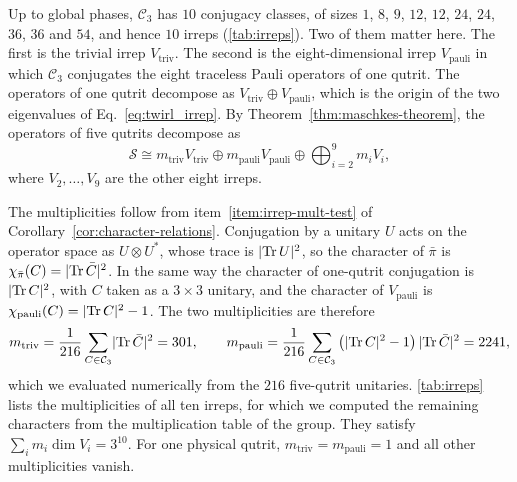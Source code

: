 Up to global phases, $\mathcal{C}_3$ has $10$ conjugacy classes, of sizes $1$, $8$, $9$, $12$, $12$, $24$, $24$, $36$, $36$ and $54$, and hence $10$ irreps (\autoref{tab:irreps}). Two of them matter here. The first is the trivial irrep $V_{\mathrm{triv}}$. The second is the eight-dimensional irrep $V_{\mathrm{pauli}}$ in which $\mathcal{C}_3$ conjugates the eight traceless Pauli operators of one qutrit. The operators of one qutrit decompose as $V_{\mathrm{triv}} \oplus V_{\mathrm{pauli}}$, which is the origin of the two eigenvalues of Eq.~\eqref{eq:twirl_irrep}. By Theorem~\ref{thm:maschkes-theorem}, the operators of five qutrits decompose as
\begin{equation}
    \mathcal{S} \cong m_{\mathrm{triv}} V_{\mathrm{triv}} \oplus m_{\mathrm{pauli}} V_{\mathrm{pauli}} \oplus \bigoplus_{i = 2}^{9} m_i V_i ,
    \label{eq:irrep-decomposition}
\end{equation}
where $V_2, \dots, V_9$ are the other eight irreps.

The multiplicities follow from item~\ref{item:irrep-mult-test} of Corollary~\ref{cor:character-relations}. Conjugation by a unitary $U$ acts on the operator space as $U \otimes U^{*}$, whose trace is $\lvert \operatorname{\mathrm{Tr}} U \rvert^2$, so the character of $\bar\pi$ is $\chi_{\bar\pi}(C) = \lvert \operatorname{\mathrm{Tr}} \bar C \rvert^2$. In the same way the character of one-qutrit conjugation is $\lvert \operatorname{\mathrm{Tr}} C \rvert^2$, with $C$ taken as a $3 \times 3$ unitary, and the character of $V_{\mathrm{pauli}}$ is $\chi_{\mathrm{pauli}}(C) = \lvert \operatorname{\mathrm{Tr}} C \rvert^2 - 1$. The two multiplicities are therefore
\begin{equation}
    m_{\mathrm{triv}} = \frac{1}{216} \sum_{C \in \mathcal{C}_3} \lvert \operatorname{\mathrm{Tr}} \bar C \rvert^2 = 301 ,
    \qquad
    m_{\mathrm{pauli}} = \frac{1}{216} \sum_{C \in \mathcal{C}_3} \left( \lvert \operatorname{\mathrm{Tr}} C \rvert^2 - 1 \right) \lvert \operatorname{\mathrm{Tr}} \bar C \rvert^2 = 2241 ,
    \label{eq:multiplicities}
\end{equation}
which we evaluated numerically from the $216$ five-qutrit unitaries. \autoref{tab:irreps} lists the multiplicities of all ten irreps, for which we computed the remaining characters from the multiplication table of the group. They satisfy $\sum_i m_i \dim V_i = 3^{10}$. For one physical qutrit, $m_{\mathrm{triv}} = m_{\mathrm{pauli}} = 1$ and all other multiplicities vanish.

